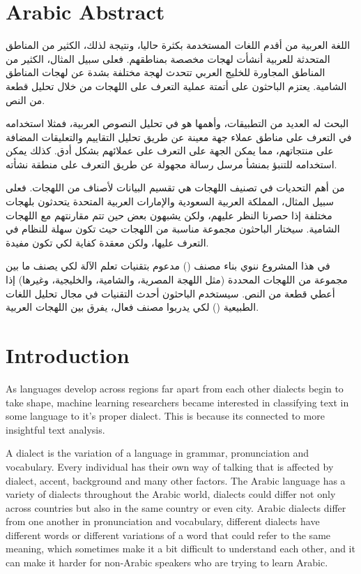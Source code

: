 \documentclass[12pt]{diazessay}
\begin{document}
\section*{Arabic Abstract}
\begin{RLtext}
اللغة العربية من أقدم اللغات المستخدمة بكثرة حاليا، ونتيجة لذلك، الكثير من المناطق المتحدثة للعربية أنشأت لهجات مخصصة بمناطقهم. فعلى سبيل المثال، الكثير من المناطق المجاورة للخليج العربي تتحدث لهجة مختلفة بشدة عن لهجات المناطق الشامية. يعتزم الباحثون على أتمتة عملية التعرف على اللهجات من خلال تحليل قطعة من النص.

البحث له العديد من التطبيقات، وأهمها هو في تحليل النصوص العربية، فمثلا استخدامه في التعرف على مناطق عملاء جهة معينة عن طريق تحليل التقاييم والتعليقات المضافة على منتجاتهم، مما يمكن الجهة على التعرف على عملائهم بشكل أدق. كذلك يمكن استخدامه للتنبؤ بمنشأ مرسل رسالة مجهولة عن طريق التعرف على منطقة نشأته.

من أهم التحديات في تصنيف اللهجات هي تقسيم البيانات لأصناف من اللهجات. فعلى سبيل المثال، المملكة العربية السعودية والإمارات العربية المتحدة يتحدثون بلهجات مختلفة إذا حصرنا النظر عليهم، ولكن يشبهون بعض حين تتم مقارنتهم مع اللهجات الشامية. سيختار الباحثون مجموعة مناسبة من اللهجات حيث تكون سهلة للنظام في التعرف عليها، ولكن معقدة كفاية لكي تكون مفيدة.

في هذا المشروع ننوي بناء مصنف () مدعوم بتقنيات تعلم الآلة لكي يصنف ما بين مجموعة من اللهجات المحددة (مثل اللهجة المصرية، والشامية، والخليجية، وغيرها) إذا أعطي قطعة من النص. سيستخدم الباحثون أحدث التقنيات في مجال تحليل اللغات الطبيعية () لكي يدربوا مصنف فعال، يفرق بين اللهجات العربية.
\end{RLtext}


\section{Introduction}
    As languages develop across regions far apart from each other dialects begin to take shape, machine learning researchers became interested in classifying text in some language to it's proper dialect. This is because its connected to more insightful text analysis.
    
    A dialect is the variation of a language in grammar, pronunciation and vocabulary. Every individual has their own way of talking that is affected by dialect, accent, background and many other factors\cite{10.5555/2126240}. The Arabic language has a variety of dialects throughout the Arabic world, dialects could differ not only across countries but also in the same country or even city. Arabic dialects differ from one another in pronunciation and vocabulary, different dialects have different words or different variations of a word that could refer to the same meaning, which sometimes make it a bit difficult to understand each other, and it can make it harder for non-Arabic speakers who are trying to learn Arabic.
    
\end{document}
